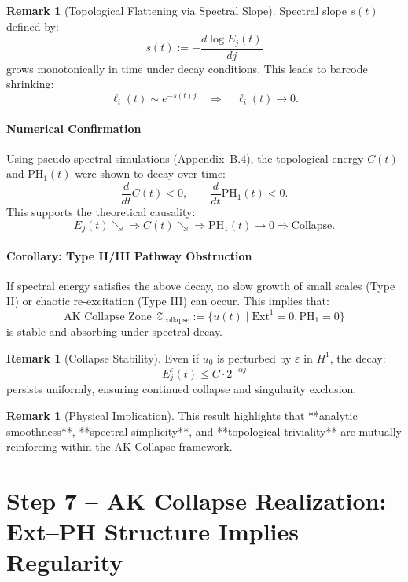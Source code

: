 \documentclass[11pt]{article}
\theoremstyle{definition}
\newtheorem{remark}[theorem]{Remark}
\begin{document}
\begin{remark}[Topological Flattening via Spectral Slope]
Spectral slope $s(t)$ defined by:
\[
s(t) := - \frac{d \log E_j(t)}{dj}
\]
grows monotonically in time under decay conditions. This leads to barcode shrinking:
\[
\ell_i(t) \sim e^{-s(t)j} \quad \Rightarrow \quad \ell_i(t) \to 0.
\]
\end{remark}

\paragraph{Numerical Confirmation}

Using pseudo-spectral simulations (Appendix~B.4), the topological energy $C(t)$ and $\mathrm{PH}_1(t)$ were shown to decay over time:
\[
\frac{d}{dt} C(t) < 0, \qquad \frac{d}{dt} \mathrm{PH}_1(t) < 0.
\]
This supports the theoretical causality:
\[
E_j(t) \searrow \Rightarrow C(t) \searrow \Rightarrow \mathrm{PH}_1(t) \to 0 \Rightarrow \text{Collapse}.
\]

\paragraph{Corollary: Type II/III Pathway Obstruction}

If spectral energy satisfies the above decay, no slow growth of small scales (Type II) or chaotic re-excitation (Type III) can occur. This implies that:
\[
\text{AK Collapse Zone } \mathcal{Z}_{\text{collapse}} := \{ u(t) \mid \mathrm{Ext}^1 = 0, \mathrm{PH}_1 = 0 \}
\]
is stable and absorbing under spectral decay.

\begin{remark}[Collapse Stability]
Even if $u_0$ is perturbed by $\varepsilon$ in $H^1$, the decay:
\[
E_j^\varepsilon(t) \le C \cdot 2^{-\alpha j}
\]
persists uniformly, ensuring continued collapse and singularity exclusion.
\end{remark}

\begin{remark}[Physical Implication]
This result highlights that **analytic smoothness**, **spectral simplicity**, and **topological triviality** are mutually reinforcing within the AK Collapse framework.
\end{remark}



\section{Step 7 – AK Collapse Realization: Ext–PH Structure Implies Regularity}
\end{document}
